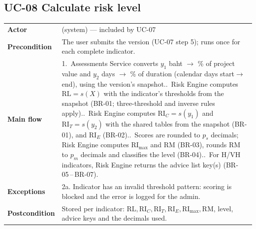 \documentclass[11pt,a4paper]{article}
\newcommand{\RL}{\mathrm{RL}}
\newcommand{\RIC}{\mathrm{RI}_{C}}
\newcommand{\RIT}{\mathrm{RI}_{T}}
\newcommand{\RIE}{\mathrm{RI}_{E}}
\newcommand{\RImax}{\mathrm{RI}_{\max}}
\newcommand{\RM}{\mathrm{RM}}
\begin{document}
\noindent\begin{minipage}{\linewidth}
\subsection*{UC-08 Calculate risk level}
\begin{tabularx}{\linewidth}{@{}>{\raggedright\leavevmode\bfseries\color{creBlue}}p{2.6cm} Y@{}}
\toprule
Actor & (system) --- included by UC-07 \\
Precondition & The user submits the version (UC-07 step 5); runs once for each complete indicator. \\
Main flow & 1.~Assessments Service converts $y_1$ baht $\to$ \% of project value and $y_2$ days $\to$ \% of duration (calendar days start$\to$end), using the version's snapshot..~Risk Engine computes $\RL = s(X)$ with the indicator's thresholds from the snapshot (BR-01; three-threshold and inverse rules apply)..~Risk Engine computes $\RIC = s(y_1)$ and $\RIT = s(y_2)$ with the shared tables from the snapshot (BR-01), and $\RIE$ (BR-02)..~Scores are rounded to $p_s$ decimals; Risk Engine computes $\RImax$ and $\RM$ (BR-03), rounds $\RM$ to $p_m$ decimals and classifies the level (BR-04)..~For H/VH indicators, Risk Engine returns the advice list key(s) (BR-05\,--\,BR-07). \\
Exceptions & 2a. Indicator has an invalid threshold pattern: scoring is blocked and the error is logged for the admin. \\
Postcondition & Stored per indicator: $\RL,\RIC,\RIT,\RIE,\RImax,\RM$, level, advice keys and the decimals used. \\
\bottomrule
\end{tabularx}
\end{minipage}
\par\medskip
\end{document}
